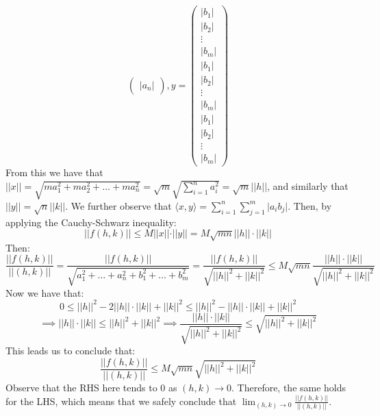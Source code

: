 \begin{solution}
$$\begin{pmatrix}
        \lvert a_n \rvert
    \end{pmatrix},
    y = \begin{pmatrix}
        \lvert b_1 \rvert \\
        \lvert b_2 \rvert \\
        \vdots \\
        \lvert b_m \rvert \\
        \lvert b_1 \rvert \\
        \lvert b_2 \rvert \\
        \vdots \\
        \lvert b_m \rvert \\
        \lvert b_1 \rvert \\
        \lvert b_2 \rvert \\
        \vdots \\
        \lvert b_m \rvert 
    \end{pmatrix}$$
    From this we have that $\lvert \lvert x \rvert \rvert = \sqrt{m a_1^2 + m a_2^2 + \ldots + m a_n^2} = \sqrt{m} \sqrt{\sum_{i=1}^{n} a_i^2} = \sqrt{m} \lvert \lvert h \rvert \rvert$, and similarly that $\lvert \lvert y \rvert \rvert = \sqrt{n} \lvert \lvert k \rvert \rvert$.
    We further observe that $\langle x, y \rangle = \sum_{i=1}^{n} \sum_{j=1}^{m} \lvert a_i b_j \rvert$.
    Then, by applying the Cauchy-Schwarz inequality:
    $$\lvert \lvert f(h, k) \rvert \rvert \leq M \lvert \lvert x \rvert \rvert \cdot \rvert \rvert y \rvert \rvert = M \sqrt{mn} \lvert \lvert h \rvert \rvert \cdot \lvert \lvert k \rvert \rvert$$
    Then:
    $$\frac{\lvert \lvert f(h, k) \rvert \rvert}{\lvert \lvert (h, k) \rvert \rvert} = \frac{\lvert \lvert f(h, k) \rvert \rvert}{\sqrt{a_1^2 + \ldots + a_n^2 + b_1^2 + \ldots + b_m^2}} = \frac{\lvert \lvert f(h, k) \rvert \rvert}{\sqrt{\lvert \lvert h \rvert \rvert^2 + \lvert \lvert k \rvert \rvert^2}} \leq M \sqrt{mn} \frac{\lvert \lvert h \rvert \rvert \cdot \lvert \lvert k \rvert \rvert}{\sqrt{\lvert \lvert h \rvert \rvert^2 + \lvert \lvert k \rvert \rvert^2}}$$
    Now we have that:
    $$0 \leq \lvert \lvert h \rvert \rvert^2 - 2 \lvert \lvert h \rvert \rvert \cdot \lvert \lvert k \rvert \rvert + \lvert \lvert k \rvert \rvert^2 \leq \lvert \lvert h \rvert \rvert^2 - \lvert \lvert h \rvert \rvert \cdot \lvert \lvert k \rvert \rvert + \lvert \lvert k \rvert \rvert^2$$
    $$\implies \lvert \lvert h \rvert \rvert \cdot \lvert \lvert k \rvert \rvert \leq \lvert \lvert h \rvert \rvert^2 + \lvert \lvert k \rvert \rvert^2 \implies \frac{\lvert \lvert h \rvert \rvert \cdot \lvert \lvert k \rvert \rvert}{\sqrt{\lvert \lvert h \rvert \rvert^2 + \lvert \lvert k \rvert \rvert^2}} \leq \sqrt{\lvert \lvert h \rvert \rvert^2 + \lvert \lvert k \rvert \rvert^2}$$
    This leads us to conclude that:
    $$\frac{\lvert \lvert f(h, k) \rvert \rvert}{\lvert \lvert (h, k) \rvert \rvert} \leq M \sqrt{mn} \sqrt{\lvert \lvert h \rvert \rvert^2 + \lvert \lvert k \rvert \rvert^2}$$
    Observe that the RHS here tends to 0 as $(h, k) \rightarrow 0$.
    Therefore, the same holds for the LHS, which means that we safely conclude that $\lim_{(h, k) \rightarrow 0} \frac{\lvert \lvert f(h, k) \rvert \rvert}{\lvert \lvert (h, k) \rvert \rvert}$.


\end{solution}
